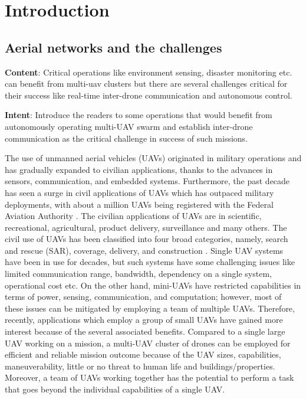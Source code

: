 \chapter{Introduction}
\label{chap-one}
\section{Aerial networks and the challenges}

\textbf{Content}: Critical operations like environment sensing, disaster monitoring etc. can benefit from multi-uav clusters but there are several challenges critical for their success like real-time inter-drone communication  and autonomous control. 

\textbf{Intent}: Introduce the readers to some operations that would benefit from autonomously operating multi-UAV swarm and establish inter-drone communication as the critical challenge in success of such missions.

The use of unmanned aerial vehicles (UAVs) originated in military operations and has gradually expanded to civilian applications, thanks to the advances in sensors, communication, and embedded systems. Furthermore, the past decade has seen a surge in civil applications of UAVs which has outpaced military deployments, with about a million UAVs being registered with the Federal Aviation Authority \cite{mydroneservices}. The civilian applications of UAVs are in scientific, recreational, agricultural, product delivery, surveillance and many others. The civil use of UAVs has been classified into four broad categories, namely, search and rescue (SAR), coverage, delivery, and construction \cite{7463007}.
Single UAV systems have been in use for decades, but such systems have some challenging issues like limited communication range, bandwidth, dependency on a single system, operational cost etc. On the other hand, mini-UAVs have restricted capabilities in terms of power, sensing, communication, and computation; however, most of these issues can be mitigated by employing a team of multiple UAVs. Therefore, recently, applications which employ a group of small UAVs have gained more interest because of the several associated benefits. Compared to a single large UAV working on a mission, a multi-UAV cluster of drones can be employed for efficient and reliable mission outcome because of the UAV sizes, capabilities, maneuverability, little or no threat to human life and buildings/properties. Moreover, a team of UAVs working together has the potential to perform a task that goes beyond the individual capabilities of a single UAV. 


